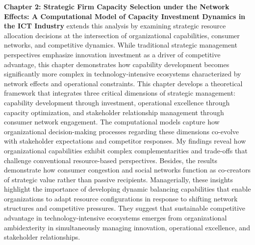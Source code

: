 \documentclass[11pt]{article}
\begin{document}
\textbf{Chapter 2: Strategic Firm Capacity Selection under the Network Effects: A Computational Model of Capacity Investment Dynamics in the ICT Industry} extends this analysis by examining strategic resource allocation decisions at the intersection of organizational capabilities, consumer networks, and competitive dynamics. While traditional strategic management perspectives emphasize innovation investment as a driver of competitive advantage, this chapter demonstrates how capability development becomes significantly more complex in technology-intensive ecosystems characterized by network effects and operational constraints.
This chapter develops a theoretical framework that integrates three critical dimensions of strategic management: capability development through investment, operational excellence through capacity optimization, and stakeholder relationship management through consumer network engagement. The computational models capture how organizational decision-making processes regarding these dimensions co-evolve with stakeholder expectations and competitor responses.
My findings reveal how organizational capabilities exhibit complex complementarities and trade-offs that challenge conventional resource-based perspectives. Besides, the results demonstrate how consumer congestion and social networks function as co-creators of strategic value rather than passive recipients. 
Managerially, these insights highlight the importance of developing dynamic balancing capabilities that enable organizations to adapt resource configurations in response to shifting network structures and competitive pressures. They suggest that sustainable competitive advantage in technology-intensive ecosystems emerges from organizational ambidexterity in simultaneously managing innovation, operational excellence, and stakeholder relationships.
\end{document}
